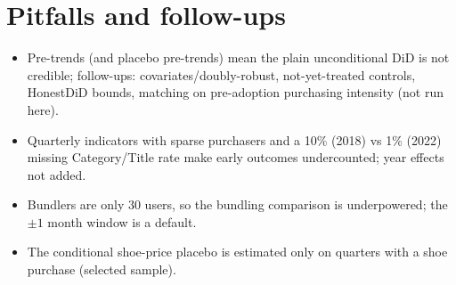 \documentclass[11pt]{article}
\begin{document}
\section{Pitfalls and follow-ups}
\begin{itemize}[nosep]
\item Pre-trends (and placebo pre-trends) mean the plain unconditional DiD is not credible; follow-ups: covariates/doubly-robust, not-yet-treated controls, HonestDiD bounds, matching on pre-adoption purchasing intensity (not run here).
\item Quarterly indicators with sparse purchasers and a 10\% (2018) vs 1\% (2022) missing Category/Title rate make early outcomes undercounted; year effects not added.
\item Bundlers are only 30 users, so the bundling comparison is underpowered; the $\pm1$ month window is a default.
\item The conditional shoe-price placebo is estimated only on quarters with a shoe purchase (selected sample).
\end{itemize}
\end{document}
